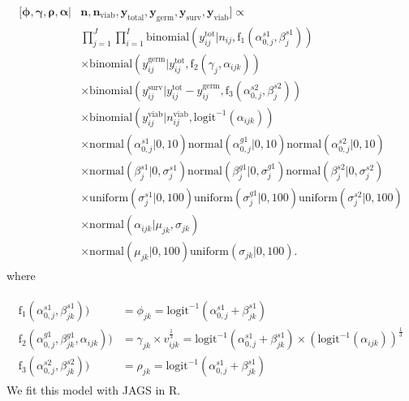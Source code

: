 \documentclass[12pt, oneside, titlepage]{article}   	%
\begin{document}
\begin{align}
  \begin{split}
 [ \bm{\phi}, \bm{\gamma}, \bm{\rho}, \bm{\alpha} | & \bm{n}, \bm{n_{\mathrm{viab}}}, \bm{y_{\mathrm{total}}},  \bm{y_{\mathrm{germ}}},  \bm{y_{\mathrm{surv}}}, \bm{y_{\mathrm{viab}}} ] \propto \\
   & \prod_{j=1}^{J} \prod_{i=1}^{I} %
   \mathrm{binomial} ( y^{\mathrm{tot}}_{ij} | n_{ij}, \mathrm{f}_1(\alpha^{s1}_{0,j} , \beta^{s1}_{j} ) ) 
 \\ & \times \mathrm{binomial} ( y^{\mathrm{germ}}_{ij}  | y^{\mathrm{tot}}_{ij}  , \mathrm{f}_2( \gamma_{j} , \alpha_{ijk}) )
 \\ & \times \mathrm{binomial} ( y^{\mathrm{surv}}_{ij} | y^{\mathrm{tot}}_{ij}  -  y^{\mathrm{germ}}_{ij}   , \mathrm{f}_3(\alpha^{s2}_{0,j} , \beta^{s2}_{j} ) ) 
 \\ & \times  \mathrm{binomial} ( y^{\mathrm{viab}}_{ij} | n^{\mathrm{viab}}_{ij}, \mathrm{logit}^{-1}(\alpha_{ijk}) ) 
    \\ & \times \mathrm{normal} ( \alpha^{s1}_{0,j} | 0, 10) \mathrm{normal} ( \alpha^{g1}_{0,j} | 0, 10) \mathrm{normal} ( \alpha^{s2}_{0,j} | 0, 10)  
    \\ & \times \mathrm{normal} ( \beta^{s1}_{j} | 0, \sigma_j^{s1}) \mathrm{normal} ( \beta^{g1}_{j} | 0, \sigma_j^{g1}) \mathrm{normal} ( \beta^{s2}_{j} | 0, \sigma_j^{s2}) 
    \\ & \times \mathrm{uniform} ( \sigma_j^{s1} | 0, 100) \mathrm{uniform} ( \sigma_j^{g1} | 0, 100)  \mathrm{uniform} ( \sigma_j^{s2} | 0, 100)   
  \\ & \times \mathrm{normal} ( \alpha_{ijk}  | \mu_{jk}, \sigma_{jk} )
  \\ & \times \mathrm{normal} ( \mu_{jk} | 0 , 100 ) \mathrm{uniform} ( \sigma_{jk} | 0,100).
  \end{split}
\end{align}
%
where

\begin{align}
  \begin{split}
\mathrm{f}_1(\alpha^{s1}_{0,j} , \beta^{s1}_{jk} ) ) & =  \phi_{jk} = \mathrm{logit}^{-1}(\alpha^{s1}_{0,j} + \beta^{s1}_{jk}) \\
\mathrm{f}_2(\alpha^{g1}_{0,j} , \beta^{g1}_{jk},  \alpha_{ijk} ) ) & = \gamma_{jk} \times v_{ijk}^\frac{1}{3} = \mathrm{logit}^{-1}(\alpha^{s1}_{0,j} + \beta^{s1}_{jk}) \times ( \mathrm{logit}^{-1}(\alpha_{ijk}))^\frac{1}{3} \\
\mathrm{f}_3(\alpha^{s2}_{0,j} , \beta^{s2}_{jk} ) ) & =  \rho_{jk} = \mathrm{logit}^{-1}(\alpha^{s1}_{0,j} + \beta^{s1}_{jk})
  \end{split}
\end{align}
%
We fit this model with JAGS in R. %
\end{document}
